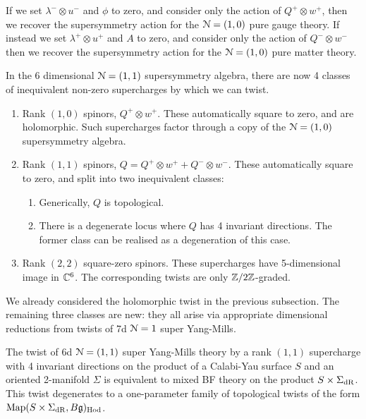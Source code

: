 \documentclass[10pt, oneside]{article}
\begin{document}
\begin{remark}
If we set $\lambda^- \otimes u^-$ and $\phi$ to zero, and consider only the action of $Q^+ \otimes w^+$, then we recover the supersymmetry action for the $\mathcal{N}=(1,0)$ pure gauge theory.  If instead we set $\lambda^+ \otimes u^+$ and $A$ to zero, and consider only the action of $Q^- \otimes w^-$ then we recover the supersymmetry action for the $\mathcal{N}=(1,0)$ pure matter theory.
\end{remark}

In the 6 dimensional $\mathcal{N}=(1,1)$ supersymmetry algebra, there are now 4 classes of inequivalent non-zero supercharges by which we can twist.
\begin{enumerate}
 \item Rank $(1,0)$ spinors, $Q^+ \otimes w^+$.  These automatically square to zero, and are holomorphic.  Such supercharges factor through a copy of the $\mathcal{N}=(1,0)$ supersymmetry algebra.
 \item Rank $(1,1)$ spinors, $Q = Q^+ \otimes w^+ + Q^- \otimes w^-$.  These automatically square to zero, and split into two inequivalent classes:
 \begin{enumerate}
 \item Generically, $Q$ is topological.
 \item There is a degenerate locus where $Q$ has 4 invariant directions.  The former class can be realised as a degeneration of this case.
 \end{enumerate}
 \item Rank $(2,2)$ square-zero spinors.  These supercharges have 5-dimensional image in $\mathbb C^6$.  The corresponding twists are only $\mathbb Z/2\mathbb Z$-graded.
\end{enumerate}

We already considered the holomorphic twist in the previous subsection.  The remaining three classes are new: they all arise via appropriate dimensional reductions from twists of 7d $\mathcal{N}=1$ super Yang-Mills.

\begin{theorem} \label{6d_rk11_twist_thm}
The twist of 6d $\mathcal{N}=(1,1)$ super Yang-Mills theory by a rank $(1,1)$ supercharge with 4 invariant directions on the product of a Calabi-Yau surface $S$ and an oriented 2-manifold $\Sigma$ is equivalent to mixed BF theory on the product $S \times \Sigma_{\mathrm{dR}}$. This twist degenerates to a one-parameter family of topological twists of the form $\operatorname{Map}(S \times \Sigma_{\mathrm{dR}}, B\mathfrak{g})_{\mathrm{Hod}}$.
\end{theorem}
\end{document}
